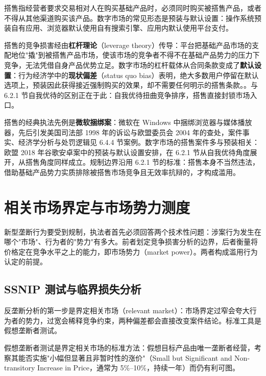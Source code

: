 \begin{definition}[搭售（tying）]
搭售指经营者要求交易相对人在购买基础产品时，必须同时购买被搭售产品，或者不得从其他渠道购买该产品。数字市场的常见形态是预装与默认设置：操作系统预装自有应用、浏览器默认使用自有搜索引擎、应用内默认使用平台支付。
\end{definition}

搭售的竞争损害经由\textbf{杠杆理论}（leverage theory）传导：平台把基础产品市场的支配地位"撬"到被搭售产品市场，使该市场的竞争者不得不在基础产品势力的压力下竞争，无法凭借自身产品优势立足。数字市场的杠杆载体从合同条款变成了\textbf{默认设置}：行为经济学中的\textbf{现状偏差}（status quo bias）表明，绝大多数用户停留在默认选项上，预装因此获得接近强制购买的效果，却不需要任何明示的搭售条款。。与 6.2.1 节自我优待的区别正在于此：自我优待扭曲竞争排序，搭售直接封锁市场入口。

搭售的经典执法先例是\textbf{微软捆绑案}：微软在 Windows 中捆绑浏览器与媒体播放器，先后引发美国司法部 1998 年的诉讼与欧盟委员会 2004 年的查处，案件事实、经济学分析与处罚逻辑见 6.4.4 节案例。数字市场的搭售案件多与预装相关：欧盟 2018 年谷歌安卓案中的预装与默认设置安排，在 6.2.1 节从自我优待角度展开，从搭售角度同样成立。规制边界沿用 6.2.1 节的标准：搭售本身不当然违法，借助基础产品势力实质排除被搭售市场竞争且无效率抗辩的，才构成滥用。

\section{相关市场界定与市场势力测度}

新型垄断行为要受到规制，执法者首先必须回答两个技术性问题：涉案行为发生在哪个"市场"、行为者的"势力"有多大。前者划定竞争损害分析的边界，后者衡量将价格定在竞争水平之上的能力，即市场势力（market power）。两者构成滥用行为认定的前提。

\subsection{SSNIP 测试与临界损失分析}

反垄断分析的第一步是界定相关市场（relevant market）：市场界定过窄会夸大行为者的势力，过宽会稀释竞争约束，两种偏差都会直接改变案件结论。标准工具是假想垄断者测试。

\begin{definition}
假想垄断者测试是界定相关市场的标准方法：假想目标产品由唯一垄断者经营，考察其能否实施"小幅但显著且非暂时性的涨价"（Small but Significant and Non-transitory Increase in Price，通常为 5\%–10\%，持续一年）而仍有利可图。
\end{definition}

